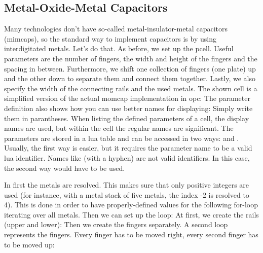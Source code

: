 \subsection{Metal-Oxide-Metal Capacitors}
Many technologies don't have so-called metal-insulator-metal capacitors (mimcaps), so the standard way to implement capacitors is by using interdigitated metals.
Let's do that.
As before, we set up the pcell.
Useful parameters are the number of fingers, the width and height of the fingers and the spacing in between.
Furthermore, we shift one collection of fingers (one plate) up and the other down to separate them and connect them together.
Lastly, we also specify the width of the connecting rails and the used metals.
The shown cell is a simplified version of the actual momcap implementation in opc:
The parameter definition also shows how you can use better names for displaying: Simply write them in parantheses.
When listing the defined parameters of a cell, the display names are used, but within the cell the regular names are significant.
The parameters are stored in a lua table and can be accessed in two ways:
 and .
Usually, the first way is easier, but it requires the parameter name to be a valid lua identifier.
Names like  (with a hyphen) are not valid identifiers.
In this case, the second way would have to be used.

In  first the metals are resolved.
This makes sure that only positive integers are used (for instance, with a metal stack of five metals, the index -2 is resolved to 4).
This is done in order to have properly-defined values for the following for-loop iterating over all metals.
Then we can set up the loop:
At first, we create the rails (upper and lower):
Then we create the fingers separately.
A second loop represents the fingers.
Every finger has to be moved right, every second finger has to be moved up:

